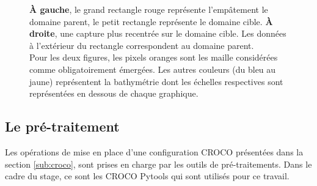 \documentclass[10pt,a4paper,titlepage]{article}
\begin{document}
\begin{figure}[H]
{        \textbf{À gauche}, le grand rectangle rouge représente l'empâtement le domaine parent, le petit rectangle représente le domaine cible.
        \textbf{À droite}, une capture plus recentrée sur le domaine cible.
        Les données à l'extérieur du rectangle correspondent au domaine parent.
        \\
        Pour les deux figures, les pixels oranges sont les maille considérées comme obligatoirement émergées.
        Les autres couleurs (du bleu au jaune) représentent la bathymétrie dont les échelles respectives sont représentées en dessous de chaque graphique.
    }
    \label{fig:imbrication}
\end{figure}


\subsection{Le pré-traitement}
\label{sub:outils_pretraitement}

Les opérations de mise en place d'une configuration CROCO présentées dans la section \ref{sub:croco}, sont prises en charge par les outils de pré-traitements. Dans le cadre du stage, ce sont les CROCO Pytools qui sont utilisés pour ce travail.



\end{document}
